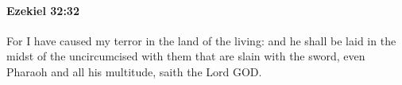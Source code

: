 
		\paragraph{Ezekiel 32:32} %
			\label{EZEKIEL-32-32}

			For I have caused my terror in the land of the living: and he shall be laid in the midst of the uncircumcised with them that are slain with the sword, even Pharaoh and all his multitude, saith the Lord GOD.

